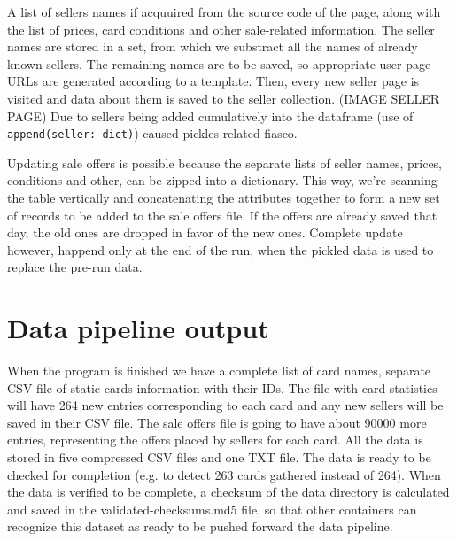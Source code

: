 A list of sellers names if acquuired from the source code of the page, along with the list of prices, card conditions and other sale-related information. The seller names are stored in a set, from which we substract all the names of already known sellers. The remaining names are to be saved, so appropriate user page URLs are generated according to a template. Then, every new seller page is visited and data about them is saved to the seller collection. (IMAGE SELLER PAGE) Due to sellers being added cumulatively into the dataframe (use of \texttt{append(seller: dict)}) caused pickles-related fiasco. \par
Updating sale offers is possible because the separate lists of seller names, prices, conditions and other, can be zipped into a dictionary. This way, we're scanning the table vertically and concatenating the attributes together to form a new set of records to be added to the sale offers file. If the offers are already saved that day, the old ones are dropped in favor of the new ones. Complete update however, happend only at the end of the run, when the pickled data is used to replace the pre-run data.


\section{Data pipeline output}
When the program is finished we have a complete list of card names, separate CSV file of static cards information with their IDs. The file with card statistics will have 264 new entries corresponding to each card and any new sellers will be saved in their CSV file. The sale offers file is going to have about 90000 more entries, representing the offers placed by sellers for each card. All the data is stored in five compressed CSV files and one TXT file. The data is ready to be checked for completion (e.g. to detect 263 cards gathered instead of 264). When the data is verified to be complete, a checksum of the data directory is calculated and saved in the validated-checksums.md5 file, so that other containers can recognize this dataset as ready to be pushed forward the data pipeline.
